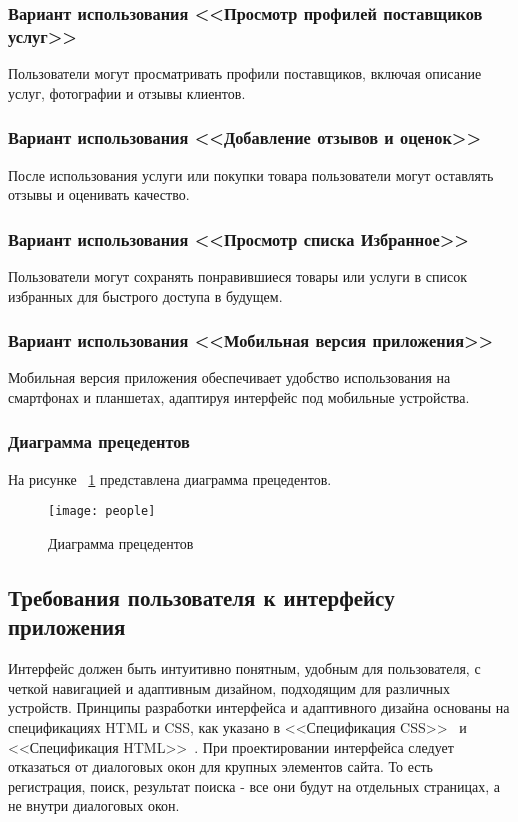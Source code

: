 \subsubsection{Вариант использования <<Просмотр профилей поставщиков услуг>>}
Пользователи могут просматривать профили поставщиков, включая описание услуг, фотографии и отзывы клиентов.

\subsubsection{Вариант использования <<Добавление отзывов и оценок>>}
После использования услуги или покупки товара пользователи могут оставлять отзывы и оценивать качество.

\subsubsection{Вариант использования <<Просмотр списка Избранное>>}
Пользователи могут сохранять понравившиеся товары или услуги в список избранных для быстрого доступа в будущем.

\subsubsection{Вариант использования <<Мобильная версия приложения>>}
Мобильная версия приложения обеспечивает удобство использования на смартфонах и планшетах, адаптируя интерфейс под мобильные устройства.

\subsubsection{Диаграмма прецедентов}
На рисунке ~\ref{people:image} представлена диаграмма прецедентов.

\begin{figure}[ht]
\centering
\texttt{[image: people]}
\caption{Диаграмма прецедентов}
\label{people:image}
\end{figure}

\subsection{Требования пользователя к интерфейсу приложения}
Интерфейс должен быть интуитивно понятным, удобным для пользователя, с четкой навигацией и адаптивным дизайном, подходящим для различных устройств. Принципы разработки интерфейса и адаптивного дизайна основаны на спецификациях HTML и CSS, как указано в <<Спецификация CSS>>~\cite{cssspecs} и <<Спецификация HTML>>~\cite{htmlbook}.
При проектировании интерфейса следует отказаться от диалоговых окон для крупных элементов сайта. То есть регистрация, поиск, результат поиска - все они будут на отдельных страницах, а не внутри диалоговых окон.

